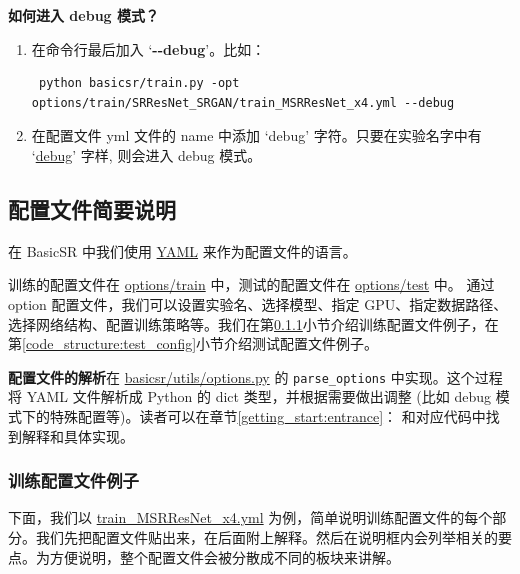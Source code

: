 \documentclass[../main.tex]{subfiles}
\begin{document}
\textbf{如何进入 debug 模式？}

\begin{enumerate}[方式 1.]
    \item 在命令行最后加入 ‘\textbf{-{}-debug}’。比如：
          \begin{verbatim}
 python basicsr/train.py -opt options/train/SRResNet_SRGAN/train_MSRResNet_x4.yml --debug
    \end{verbatim}
    \item 在配置文件 yml 文件的 name 中添加 ‘debug’ 字符。只要在实验名字中有 ‘\uline{debug}’ 字样, 则会进入 debug 模式。
\end{enumerate}

\subsection{配置文件简要说明}\label{code_structure:config_example}

在 BasicSR 中我们使用 \href{https://yaml.org/}{YAML} 来作为配置文件的语言。

训练的配置文件在 \href{https://github.com/XPixelGroup/BasicSR/tree/master/options/train}{options/train} 中，测试的配置文件在 \href{https://github.com/XPixelGroup/BasicSR/tree/master/options/test}{options/test} 中。
通过 option 配置文件，我们可以设置实验名、选择模型、指定 GPU、指定数据路径、选择网络结构、配置训练策略等。我们在第\ref{code_structure:train_config}小节介绍训练配置文件例子，在第\ref{code_structure:test_config}小节介绍测试配置文件例子。

\textbf{配置文件的解析}在 \href{https://github.com/XPixelGroup/BasicSR/blob/master/basicsr/utils/options.py}{basicsr/utils/options.py} 的 \texttt{parse\_options} 中实现。这个过程将 YAML 文件解析成 Python 的 dict 类型，并根据需要做出调整 (比如 debug 模式下的特殊配置等)。读者可以在章节\ref{getting_start:entrance}： 和对应代码中找到解释和具体实现。

\subsubsection{训练配置文件例子}\label{code_structure:train_config}

下面，我们以 \href{https://github.com/XPixelGroup/BasicSR/blob/master/options/train/SRResNet_SRGAN/train_MSRResNet_x4.yml}{train\_MSRResNet\_x4.yml} 为例，简单说明训练配置文件的每个部分。我们先把配置文件贴出来，在后面附上解释。然后在说明框内会列举相关的要点。为方便说明，整个配置文件会被分散成不同的板块来讲解。
\end{document}
